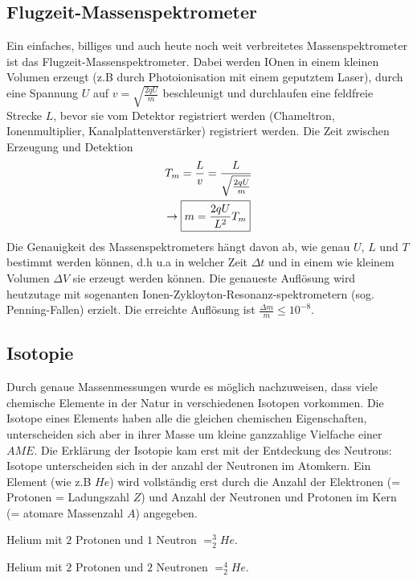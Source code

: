\subsection{Flugzeit-Massenspektrometer} %
\label{sub:Flugzeit-Massenspektrometer}
Ein einfaches, billiges und auch heute noch weit verbreitetes
Massenspektrometer ist das Flugzeit-Massenspektrometer. Dabei werden IOnen in
einem kleinen Volumen erzeugt (z.B durch Photoionisation mit einem geputztem
Laser), durch eine Spannung $U$ auf $v = \sqrt{\frac{2qU}{m}}$ beschleunigt und
durchlaufen eine feldfreie Strecke $L$, bevor sie vom Detektor registriert
werden (Chameltron, Ionenmultiplier, Kanalplattenverstärker) registriert
werden.
Die Zeit zwischen Erzeugung und Detektion
\begin{gather*}
    T_m = \frac{L}{v} = \frac{L}{\sqrt{\frac{2qU}{m}}} \\
    \rightarrow
    \boxed{
        m = \frac{2qU}{L^2}T_m
    }
\end{gather*}
Die Genauigkeit des Massenspektrometers hängt davon ab, wie genau $U$, $L$ und
$T$ bestimmt werden können, d.h u.a in welcher Zeit $\Delta t$ und in einem wie
kleinem Volumen $\Delta V$ sie erzeugt werden können.
Die genaueste Auflösung wird heutzutage mit sogenanten
Ionen-Zykloyton-Resonanz-spektrometern (sog. Penning-Fallen) erzielt. Die
erreichte Auflösung ist $\frac{\Delta m}{m} \leq 10^{-8}$.

\subsection{Isotopie} %
\label{sub:Isotopie}
Durch genaue Massenmessungen wurde es möglich nachzuweisen, dass viele
chemische Elemente in der Natur in verschiedenen Isotopen vorkommen. Die
Isotope eines Elements haben alle die gleichen chemischen Eigenschaften,
unterscheiden sich aber in ihrer Masse
um kleine ganzzahlige Vielfache einer $AME$. Die Erklärung der Isotopie kam
erst mit der Entdeckung des Neutrons: Isotope unterscheiden sich in der anzahl
der Neutronen im Atomkern. Ein Element (wie z.B $He$) wird vollständig erst
durch die Anzahl der Elektronen (= Protonen = Ladungszahl $Z$) und Anzahl der
Neutronen und Protonen im Kern (= atomare Massenzahl $A$) angegeben.
\begin{beis}
    Helium mit $2$ Protonen und $1$ Neutron $= ^3_2 He$.

    Helium mit $2$ Protonen und $2$ Neutronen $= ^4_2 He$.
\end{beis}


